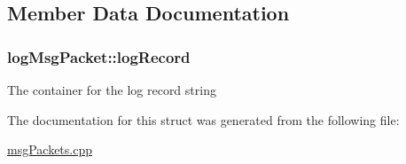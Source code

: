 \subsection{Member Data Documentation}
\hypertarget{structlogMsgPacket_a3080c749154c1b7e0f885d5a0bc5859b}{
\subsubsection[{log\-Record}]{\setlength{\rightskip}{0pt plus 5cm}log\-Msg\-Packet\-::log\-Record}}\label{structlogMsgPacket_a3080c749154c1b7e0f885d5a0bc5859b}
The container for the log record string 

The documentation for this struct was generated from the following file\-:\begin{DoxyCompactItemize}
\item 
\hyperlink{msgPackets_8cpp}{msg\-Packets.\-cpp}\end{DoxyCompactItemize}
